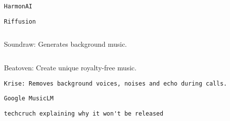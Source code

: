          
         
          \protect\hypertarget{ID_1176296644}{}{}

\begin{verbatim}
HarmonAI
\end{verbatim}
         

         
         
          \protect\hypertarget{ID_1590005483}{}{}

\begin{verbatim}
Riffusion
\end{verbatim}
         

         
         
          \protect\hypertarget{ID_602203779}{}{}

\begin{verbatim}
\end{verbatim}

          Soundraw: Generates background music.
         

         
         
          \protect\hypertarget{ID_765312573}{}{}

\begin{verbatim}
\end{verbatim}

          Beatoven: Create unique royalty-free music.
         

         
         
          \protect\hypertarget{ID_358919345}{}{}

\begin{verbatim}
Krise: Removes background voices, noises and echo during calls.
\end{verbatim}
         

         
         
          \protect\hypertarget{ID_203268352}{}{}

\begin{verbatim}
Google MusicLM
\end{verbatim}

           
           
            \protect\hypertarget{ID_813630025}{}{}

\begin{verbatim}
techcruch explaining why it won't be released
\end{verbatim}
           
         
       
     

     
     
